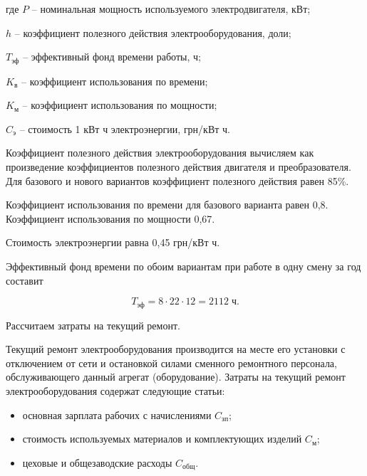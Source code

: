         \begin{ESKDexplanation}
            \item [где ] $P$ – номинальная мощность используемого
                электродвигателя, кВт; 
            \item $h$ – коэффициент полезного действия электрооборудования,
                доли;
            \item $T_\text{эф}$ – эффективный фонд времени работы, ч;
            \item $K_\text{в}$ – коэффициент использования по времени;
            \item $K_\text{м}$ – коэффициент использования по мощности;
            \item $C_\text{э}$ – стоимость 1 кВт ч электроэнергии, грн/кВт ч.
        \end{ESKDexplanation}

        Коэффициент полезного действия электрооборудования вычисляем как
        произведение коэффициентов полезного действия двигателя и
        преобразователя.  Для базового и нового вариантов коэффициент полезного
        действия равен 85\%.

        Коэффициент использования по времени для базового варианта равен 0,8.
        Коэффициент использования по мощности 0,67.

        Стоимость электроэнергии равна 0,45 грн/кВт ч.

        Эффективный фонд времени по обоим вариантам при работе в одну смену за
        год составит

        \begin{equation}
            T_\text{эф} = 8 \cdot 22 \cdot 12 = 2112 \; \text{ч}. 
        \end{equation}

        Рассчитаем затраты на текущий ремонт.

        Текущий ремонт электрооборудования производится на месте его установки
        с отключением от сети и остановкой силами сменного ремонтного
        персонала, обслуживающего данный агрегат (оборудование).  Затраты на
        текущий ремонт электрооборудования содержат следующие статьи:

        \begin{itemize}
            \item основная зарплата рабочих с начислениями $C_\text{зп}$;
            \item стоимость используемых материалов и комплектующих изделий
                $C_\text{м}$;
            \item цеховые и общезаводские расходы $C_\text{общ}$.
        \end{itemize}

